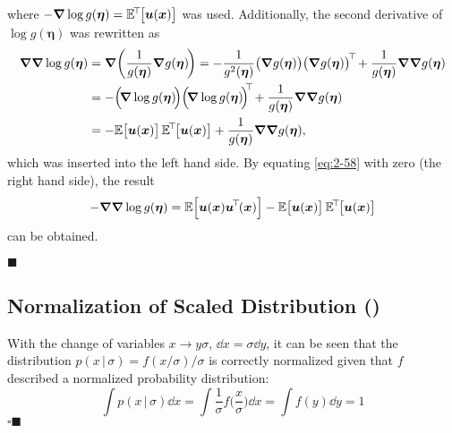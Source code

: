 \documentclass[11pt, a4paper]{scrartcl}
\newcommand{\E}{\mathbb{E}}
\newcommand{\transposed}{{\!\top\!}}
\renewcommand{\vec}[1]{\bm{#1}}
\newcommand{\given}{\,\vert\,}
\newcommand{\eot}{\hfill\(\blacksquare\)}
\newcommand{\qedeot}{\hfill\(\square\blacksquare\)}
\newcommand{\diffstar}{\texorpdfstring{\raisebox{-1pt}{\resizebox{!}{8pt}{\(\star\)}}}{*}}
\newcommand{\onestar}  {(\diffstar)}
\begin{document}
			where \( -\grad{\log g(\vec{\eta})} = \E^\transposed\big[ \vec{u}(\vec{x}) \big] \) was used. Additionally, the second derivative of \( \log g(\vec{\eta}) \) was rewritten as
			\begin{align}
				\grad{\grad{\log g(\vec{\eta})}}
					&= \grad \bigg( \frac{1}{g(\vec{\eta})} \grad{g(\vec{\eta})} \!\bigg)
					 = -\frac{1}{g^2(\vec{\eta})} \big(\grad{g(\vec{\eta})}\big) \big(\grad{g(\vec{\eta})}\big)^\transposed + \frac{1}{g(\vec{\eta})} \grad{\grad{g(\vec{\eta})}} \\
					&= -\Big(\! \grad{\log g(\vec{\eta})} \!\Big) \Big(\! \grad{\log g(\vec{\eta})} \!\Big)^{\!\transposed} + \frac{1}{g(\vec{\eta})} \grad{\grad{g(\vec{\eta})}} \\
					&= -\E\big[ \vec{u}(\vec{x}) \big] \, \E^\transposed\big[ \vec{u}(\vec{x}) \big] + \frac{1}{g(\vec{\eta})} \grad{\grad{g(\vec{\eta})}},
			\end{align}
			which was inserted into the left hand side. By equating \eqref{eq:2-58} with zero (the right hand side), the result
			\begin{equation}
				-\grad{\grad{\log g(\vec{\eta})}} = \E\Big[ \vec{u}(\vec{x}) \vec{u}^\transposed(\vec{x}) \Big] - \E\big[ \vec{u}(\vec{x}) \big] \, \E^\transposed\big[ \vec{u}(\vec{x}) \big]
			\end{equation}
			can be obtained.

			\eot

		\subsection{Normalization of Scaled Distribution  \onestar}
			With the change of variables \( x \to y\sigma \), \( \dd x = \sigma \dd{y} \), it can be seen that the distribution \( p(x \given \sigma) = f(x/\sigma)/\sigma \) is correctly normalized given that \(f\) described a normalized probability distribution:
			\begin{equation}
				\int\! p(x \given \sigma) \dd{x}
					= \int\! \frac{1}{\sigma} f\bigg(\frac{x}{\sigma}\bigg) \dd{x}
					= \int\! f(y) \dd{y}
					= 1
			\end{equation}
			\qedeot
\end{document}
